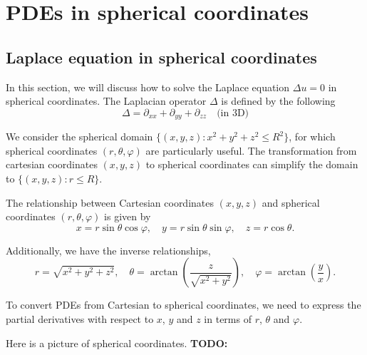 \section{PDEs in spherical coordinates}

\subsection{Laplace equation in spherical coordinates}

In this section, we will discuss how to solve the Laplace equation $\Delta u = 0$ in spherical coordinates. The Laplacian operator $\Delta$ is defined by the following
\begin{equation}\label{eq.Laplacian_spherical}
    \Delta = \partial_{xx} + \partial_{yy} + \partial_{zz} \quad \textrm{(in 3D)}
\end{equation}

We consider the spherical domain $\{(x, y, z): x^2 + y^2 + z^2 \le R^2\}$, for which spherical coordinates $(r, \theta, \varphi)$ are particularly useful. The transformation from cartesian coordinates $(x, y, z)$ to spherical coordinates can simplify the domain to $\{(x, y, z): r \le R\}$.

The relationship between Cartesian coordinates $(x, y, z)$ and spherical coordinates $(r, \theta, \varphi)$ is given by
\begin{equation}\label{eq.from_cartesian_to_spherical}
    x=r \sin \theta \cos \varphi, \quad y=r \sin \theta \sin \varphi, \quad z=r \cos \theta.
\end{equation}

Additionally, we have the inverse relationships,
\begin{equation}\label{eq.from_spherical_to_cartesian}
    r = \sqrt{x^2 + y^2 + z^2}, \quad \theta = \arctan\left(\frac{z}{\sqrt{x^2 + y^2}}\right), \quad \varphi = \arctan\left(\frac{y}{x}\right).
\end{equation}

To convert PDEs from Cartesian to spherical coordinates, we need to express the partial derivatives with respect to $x$, $y$ and $z$ in terms of $r$, $\theta$ and $\varphi$.

Here is a picture of spherical coordinates.
\textbf{TODO: }


